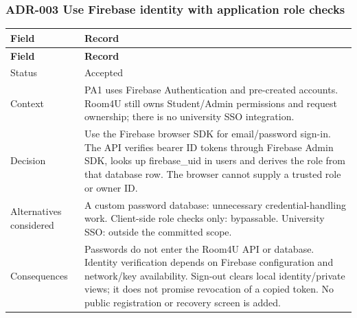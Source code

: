 \vspace{2mm}

\subsubsection{ADR-003 Use Firebase identity with application role checks}

\begin{longtable}{|p{}|p{}|}

\hline

\textbf{Field} & \textbf{Record} \\ \hline

\endfirsthead

\hline

\textbf{Field} & \textbf{Record} \\ \hline

\endhead

Status & Accepted \\ \hline

Context & PA1 uses Firebase Authentication and pre-\allowbreak{}created accounts.\allowbreak{} Room4U still owns Student/\allowbreak{}Admin permissions and request ownership; there is no university SSO integration.\allowbreak{} \\ \hline

Decision & Use the Firebase browser SDK for email/\allowbreak{}password sign-\allowbreak{}in.\allowbreak{} The API verifies bearer ID tokens through Firebase Admin SDK, looks up firebase\_\allowbreak{}uid in users and derives the role from that database row.\allowbreak{} The browser cannot supply a trusted role or owner ID.\allowbreak{} \\ \hline

Alternatives considered & A custom password database: unnecessary credential-\allowbreak{}handling work.\allowbreak{} Client-\allowbreak{}side role checks only: bypassable.\allowbreak{} University SSO: outside the committed scope.\allowbreak{} \\ \hline

Consequences & Passwords do not enter the Room4U API or database.\allowbreak{} Identity verification depends on Firebase configuration and network/\allowbreak{}key availability.\allowbreak{} Sign-\allowbreak{}out clears local identity/\allowbreak{}private views; it does not promise revocation of a copied token.\allowbreak{} No public registration or recovery screen is added.\allowbreak{} \\ \hline

\end{longtable}

